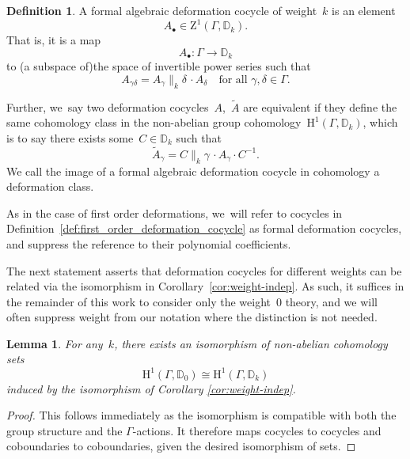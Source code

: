 \documentclass[10pt,a4paper]{article}
\numberwithin{equation}{section}
\let\oldbullet\bullet
\renewcommand{\bullet}{{\scriptscriptstyle\oldbullet}}
\theoremstyle{plain}
\newtheorem{lemma}[theoremcounter]{Lemma}
\theoremstyle{definition}
\newtheorem{definition}[theoremcounter]{Definition}
\newcommand{\tx}{\text}
\newcommand{\bbD}{\ensuremath{\mathbb{D}}}
\newcommand{\rmH}{\ensuremath{\mathrm{H}}}
\newcommand{\rmZ}{\ensuremath{\mathrm{Z}}}
\let\wtd\widetilde
\newcommand{\defcol}{\mathrel{:}}
\let\Ga\Gamma
\let\ga\gamma
\begin{document}
\begin{definition}
\label{def:algebraic_deformation_cocycle}
A formal algebraic deformation cocycle of weight~$k$ is an element
\begin{equation*}
A_\bullet \in \rmZ^1(\Ga,\bbD_k)
\tx{.}
\end{equation*}
That is, it is a map
\begin{equation*}
A_\bullet \defcol \Ga \to \bbD_k
\end{equation*}
to (a subspace of)the space of invertible power series such that
\begin{equation*}
A_{\ga\delta} = A_\ga\big\|_k \delta\,\cdot A_\delta
\quad
\tx{for all\ }\ga, \delta \in \Ga
\tx{.}
\end{equation*}

Further, we~say two deformation cocycles~$A$,~$\wtd{A}$ are equivalent if they define the same cohomology class in the non-abelian group cohomology~$\rmH^1(\Ga,\bbD_k)$, which is to say there exists some~$C\in\bbD_k$ such that
\begin{equation*}
\wtd{A}_\ga = C\big\|_k\ga\,\cdot A_\ga\cdot C^{-1}
\tx{.}
\end{equation*}
We call the image of a formal algebraic deformation cocycle in cohomology a deformation class.
\end{definition}

As in the case of first order deformations, we~will refer to cocycles in Definition~\ref{def:first_order_deformation_cocycle} as formal deformation cocycles, and suppress the reference to their polynomial coefficients.

The next statement asserts that deformation cocycles for different weights can be related via the isomorphism in Corollary~\ref{cor:weight-indep}. As such, it suffices in the remainder of this work to consider only the weight~$0$ theory, and we will often suppress weight from our notation where the distinction is not needed.

\begin{lemma}
\label{lem:weight-independence}
For any~$k$, there exists an isomorphism of non-abelian cohomology sets
\begin{equation*}
\rmH^1(\Ga,\bbD_0) \cong \rmH^1(\Ga,\bbD_k)
\end{equation*}
induced by the isomorphism of Corollary \ref{cor:weight-indep}.
\end{lemma}

\begin{proof}
This follows immediately as the isomorphism is compatible with both the group structure and the $\Ga$-actions. It therefore maps cocycles to cocycles and coboundaries to coboundaries, given the desired isomorphism of sets.
\end{proof}
\end{document}
